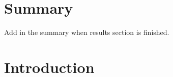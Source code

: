 \documentclass[obeyspaces, spaces, fleqn,10pt]{SelfArx} %
\begin{document}
\flushbottom %

\maketitle %

\tableofcontents %

\thispagestyle{empty} %


\section*{Summary} %



Add in the summary when results section is finished.


\section{Introduction}
\end{document}
